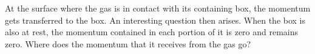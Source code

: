 \documentclass[a4paper,12pt,%
onecolumn,oneside,%
british%
]{memoir}
\renewcommand*{\|}[1][]{\nonscript\:#1\vert\nonscript\:\mathopen{}}
\begin{document}
At the surface where the gas is in contact with its containing box, the momentum gets transferred to the box. An interesting question then arises. When the box is also at rest, the momentum contained in each portion of it is zero and remains zero. Where does the momentum that it receives from the gas go?
%
%
\end{document}
